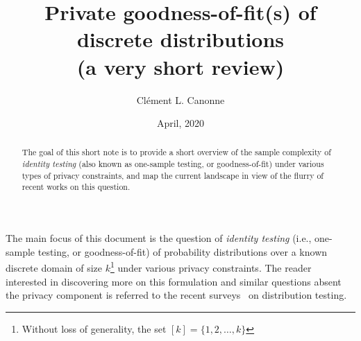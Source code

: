 \documentclass[10pt]{article}
\title{Private goodness-of-fit(s) of discrete distributions\\
(a very short review)}
\date{April, 2020}
\author{Cl\'ement L. Canonne}
\newcommand{\ab}{k}
\begin{document}
\maketitle

\begin{abstract}
The goal of this short note is to provide a short overview of the sample complexity of \emph{identity testing} (also known as one-sample testing, or goodness-of-fit) under various types of privacy constraints, and map the current landscape in view of the flurry of recent works on this question.
\end{abstract}

The main focus of this document is the question of \emph{identity testing} (i.e., one-sample testing, or goodness-of-fit) of probability distributions over a known discrete domain of size $\ab$\footnote{Without loss of generality, the set $[\ab]=\{1,2,\dots,\ab\}$} {under various privacy constraints}. The reader interested in discovering more on this formulation and similar questions absent the privacy component is referred to the recent surveys~\cite{Canonne15,BalakrishnanW18} on distribution testing.
\end{document}
